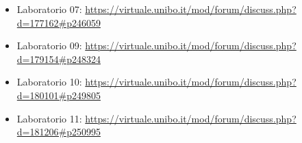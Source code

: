 \documentclass[a4paper,12pt]{report}
\begin{document}
\begin{itemize}
	\item Laboratorio 07: \url{https://virtuale.unibo.it/mod/forum/discuss.php?d=177162#p246059}
	\item Laboratorio 09: \url{https://virtuale.unibo.it/mod/forum/discuss.php?d=179154#p248324}
	\item Laboratorio 10: \url{https://virtuale.unibo.it/mod/forum/discuss.php?d=180101#p249805}
	\item Laboratorio 11: \url{https://virtuale.unibo.it/mod/forum/discuss.php?d=181206#p250995}
\end{itemize}




\nocite{*}
\end{document}
